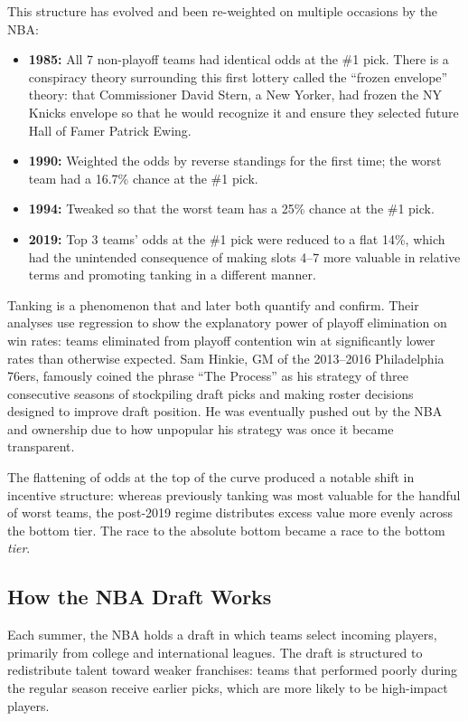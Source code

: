 \documentclass{article}
\begin{document}
This structure has evolved and been re-weighted on multiple occasions by the
NBA:
\begin{itemize}
    \item \textbf{1985:} All 7 non-playoff teams had identical odds at the
    \#1 pick. There is a conspiracy theory surrounding this first lottery
    called the ``frozen envelope'' theory: that Commissioner David Stern, a
    New Yorker, had frozen the NY Knicks envelope so that he would recognize
    it and ensure they selected future Hall of Famer Patrick Ewing.
    \item \textbf{1990:} Weighted the odds by reverse standings for the first
    time; the worst team had a 16.7\% chance at the \#1 pick.
    \item \textbf{1994:} Tweaked so that the worst team has a 25\% chance at
    the \#1 pick.
    \item \textbf{2019:} Top 3 teams' odds at the \#1 pick were reduced to a
    flat 14\%, which had the unintended consequence of making slots 4--7 more
    valuable in relative terms and promoting tanking in a different manner.
\end{itemize}

Tanking is a phenomenon that \citet{taylor2002} and later \citet{schmidt2024}
both quantify and confirm.
Their analyses use regression to show the explanatory power of playoff
elimination on win rates: teams eliminated from playoff contention win at
significantly lower rates than otherwise expected.
Sam Hinkie, GM of the 2013--2016 Philadelphia 76ers, famously coined the
phrase ``The Process'' as his strategy of three consecutive seasons of
stockpiling draft picks and making roster decisions designed to improve draft
position.
He was eventually pushed out by the NBA and ownership due to how unpopular
his strategy was once it became transparent.

The flattening of odds at the top of the curve produced a notable shift in
incentive structure: whereas previously tanking was most valuable for the
handful of worst teams, the post-2019 regime distributes excess value more
evenly across the bottom tier.
The race to the absolute bottom became a race to the bottom \emph{tier}.

\subsection{How the NBA Draft Works}

Each summer, the NBA holds a draft in which teams select incoming players,
primarily from college and international leagues.
The draft is structured to redistribute talent toward weaker franchises: teams
that performed poorly during the regular season receive earlier picks, which
are more likely to be high-impact players.
\end{document}
